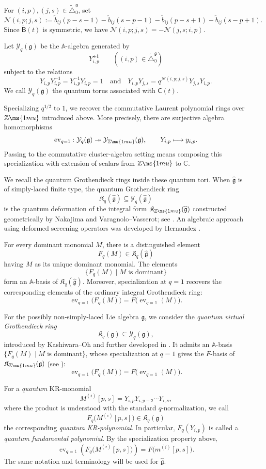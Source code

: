 \documentclass[12pt, leqno]{amsart}
\numberwithin{equation}{section}
\theoremstyle{plain}
\theoremstyle{definition}
\newcommand{\seteq}{\mathbin{:=}}
\newcommand{\ev}{{\operatorname{ev}}}
\newcommand{\g}{\mathfrak{g}}
\newcommand{\C}{\mathbb{C}}
\newcommand{\Z}{\mathbb{Z}\ms{1mu}}
\newcommand{\Dynkin}{\triangle}
\newcommand{\tb}{\widetilde{b}}
\newcommand{\hg}{{\widehat{\g}}}
\newcommand{\frakK}{\mathfrak{K}}
\newcommand{\sfB}{\mathsf{B}}
\newcommand{\sfC}{\mathsf{C}}
\newcommand{\tsfB}{\widetilde{\sfB}}
\newcommand{\bbA}{\mathbb{A}}
\newcommand{\calN}{\mathcal{N}}
\newcommand{\calY}{\mathcal{Y}}
\newcommand{\tDynkin}{{\widetilde{\Dynkin}}}
\newcommand{\qtq}[1][{and}]{\quad\text{{#1}}\quad}
\begin{document}
For $(i,p),(j,s)\in\tDynkin_0^\g$, set
\[
\calN(i,p;j,s) \seteq \tb_{ij}(p-s-1)-\tb_{ij}(s-p-1) -\tb_{ij}(p-s+1)+\tb_{ij}(s-p+1).
\]
Since $\tsfB(t)$ is symmetric, we have $\calN(i,p;j,s)=-\calN(j,s;i,p)$.

Let $\calY_q(\g)$ be the $\bbA$-algebra generated by
\[
Y_{i,p}^{\pm1} \qquad ((i,p)\in\tDynkin_0^\g)
\]
subject to the relations
\[
Y_{i,p}Y_{i,p}^{-1} = Y_{i,p}^{-1}Y_{i,p} = 1 \qtq  Y_{i,p}Y_{j,s} = q^{\calN(i,p;j,s)} Y_{j,s}Y_{i,p}.
\]
We call $\calY_q(\g)$ the quantum torus associated with $\sfC(t)$. \par
Specializing $q^{1/2}$ to $1$, we recover the commutative Laurent
polynomial rings over $\Z$ introduced above.  More precisely, there are
surjective algebra homomorphisms
\[
\ev_{q=1}:\calY_q(\g)\twoheadrightarrow\calY_{\Z}(\g),
\qquad
Y_{i,p}\longmapsto y_{i,p}.
\]
Passing to the commutative cluster-algebra setting means composing
this specialization with extension of scalars from $\Z$ to $\C$.

We recall the quantum Grothendieck rings inside these quantum
tori.  When $\hg$ is of simply-laced finite type, the quantum
Grothendieck ring
\[
\frakK_q(\hg)\subseteq\calY_q(\hg)
\]
is the quantum deformation of the integral form $\frakK_{\Z}(\hg)$ constructed
geometrically by Nakajima and Varagnolo--Vasserot; see
\cite{Nak01,Nak04,VV03}.  An algebraic approach using deformed
screening operators was developed by Hernandez \cite{Her04}.

For every dominant monomial  $M$, there is a distinguished element
\[
 F_q(M)\in\frakK_q(\hg)
\]
having  $M${} as its unique dominant monomial.  The elements
\[
 \{F_q(M)\mid M\text{ is dominant}\}
\]
form an $\bbA$-basis of $\frakK_q(\hg)$.  Moreover, specialization
at $q=1$ recovers the corresponding elements of the ordinary
integral Grothendieck ring:
\[
 \ev_{q=1}\bigl(F_q(M)\bigr)=F\bigl(\ev_{q=1}(M)\bigr).
\]

For the possibly non-simply-laced Lie algebra $\g$, we consider the
\emph{quantum virtual Grothendieck ring}
\[
\frakK_q(\g)\subseteq\calY_q(\g),
\]
introduced by Kashiwara--Oh \cite{KO23} and further developed in
\cite{JLO1,JLO2}.  It admits an $\bbA$-basis
 $\{F_q(M)\mid M\text{ is dominant}\}$,
whose specialization at $q=1$ gives the $F$-basis of
$\frakK_{\Z}(\g)$ (see \cite[Corollary~5.28]{JLO1}):
\[
 \ev_{q=1}\bigl(F_q(M)\bigr) = F\bigl(\ev_{q=1}(M)\bigr).
\]

For a \emph{quantum} KR-monomial
\[
M^{(i)}[p,s] = Y_{i,p}Y_{i,p+2}\cdots Y_{i,s},
\]
where the product is understood with the standard $q$-normalization,
we call
\[
F_q\bigl(M^{(i)}[p,s]\bigr)\in\frakK_q(\g)
\]
the corresponding \emph{quantum KR-polynomial}.  In particular,
$F_q(Y_{i,p})$ is called a \emph{quantum fundamental polynomial}.
By the specialization property above,
\[
\ev_{q=1}\left(F_q\bigl(M^{(i)}[p,s]\bigr)\right) = F\bigl(m^{(i)}[p,s]\bigr).
\]
The same notation and terminology will be used for $\hg$.
\end{document}
